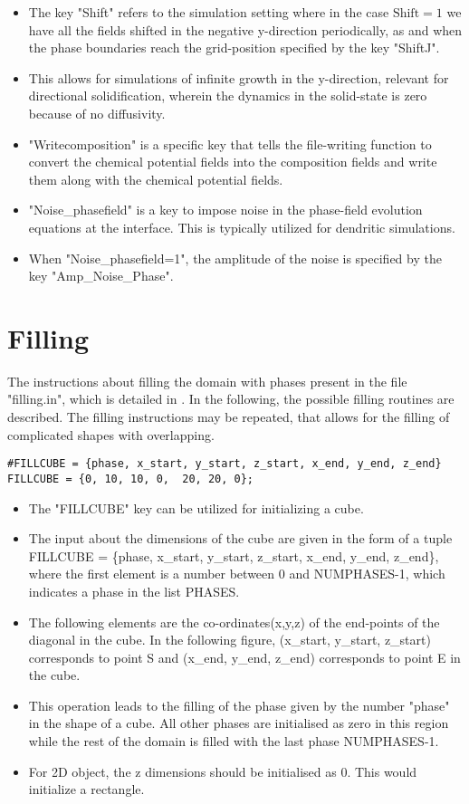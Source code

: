 \documentclass[a4paper,10pt]{article}
\begin{document}
\begin{itemize}
 \item The key "Shift" refers to the simulation setting where in the case $\textrm{Shift}=1$ we have all the fields shifted in the negative y-direction
 periodically, as and when the phase boundaries reach the grid-position specified by the key "ShiftJ".
 \item This allows for simulations of infinite growth in the y-direction, relevant for directional solidification, wherein the dynamics in the solid-state
 is zero because of no diffusivity.
 \item "Writecomposition" is a specific key that tells the file-writing function to convert the chemical potential fields into the composition fields and write 
 them along with the chemical potential fields.
 \item "Noise\_phasefield" is a key to impose noise in the phase-field evolution equations at the interface. This is typically utilized for dendritic simulations.
 \item When "Noise\_phasefield=1", the amplitude of the noise is specified by the key "Amp\_Noise\_Phase".
\end{itemize}


\section{Filling}

The instructions about filling the domain with phases present in the file "filling.in", which 
is detailed in . In the following, the possible filling routines 
are described. The filling instructions may be repeated, that allows for the filling of 
complicated shapes with overlapping. 

\begin{lstlisting}
#FILLCUBE = {phase, x_start, y_start, z_start, x_end, y_end, z_end}
FILLCUBE = {0, 10, 10, 0,  20, 20, 0};
\end{lstlisting}

\begin{itemize}
 \item The "FILLCUBE" key can be utilized for initializing a cube.
 \item The input about the dimensions of the cube are given in the form of a tuple FILLCUBE = \{phase, x\_start, y\_start, z\_start, x\_end, y\_end, z\_end\}, where the 
 first element is a number between 0 and NUMPHASES-1, which indicates a phase in the list PHASES.
 \item The following elements are the co-ordinates(x,y,z) of the end-points of the diagonal in the cube. In the following figure, (x\_start, y\_start, z\_start) corresponds
 to point S and (x\_end, y\_end, z\_end) corresponds to point E in the cube.
 \item This operation leads to the filling of the phase given by the number "phase" in the shape of a cube. All other phases are initialised as zero in this region while the 
 rest of the domain is filled with the last phase NUMPHASES-1.
 \item For 2D object, the z dimensions should be initialised as 0. This would initialize a rectangle.
\end{itemize}
\end{document}

